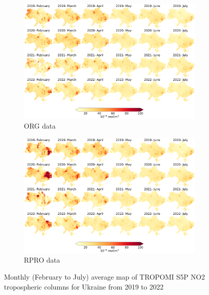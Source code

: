 \begin{figure}[p]
    \centering
    \begin{subfigure}{\textwidth}
      \centering
      \includegraphics[width=\textwidth]{figs/chap3/fig1_a.png}
      \caption{ORG data}
      \label{fig:chap3_fig1a}
    \end{subfigure}

    \begin{subfigure}{\textwidth}
      \centering
      \includegraphics[width=\textwidth]{figs/chap3/fig1_b.png}
      \caption{RPRO data}
      \label{fig:chap3_fig1b}
    \end{subfigure}
    \caption[Monthly map of S5P NO2 in Ukraine]{Monthly (February to July) average map of TROPOMI S5P NO2 tropospheric columns for Ukraine from 2019 to 2022}
    \label{fig:chap3_fig1}
\end{figure}

